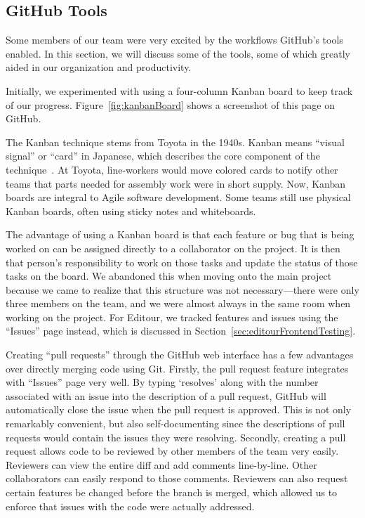 \documentclass[a4paper, 10pt, american, titlepage]{article}
\begin{document}
\subsection{GitHub Tools}
\label{sec:gitHubTools}

Some members of our team were very excited by the workflows GitHub's tools
enabled. In this section, we will discuss some of the tools, some of which
greatly aided in our organization and productivity.

Initially, we experimented with using a four-column Kanban board to keep track
of our progress. Figure~\ref{fig:kanbanBoard} shows a screenshot of this page on
GitHub.

The Kanban technique stems from Toyota in the 1940s. Kanban means ``visual
signal'' or ``card'' in Japanese, which describes the core component of the
technique~\autocite{terry2019}. At Toyota, line-workers would move colored cards
to notify other teams that parts needed for assembly work were in short supply.
Now, Kanban boards are integral to Agile software development. Some teams still
use physical Kanban boards, often using sticky notes and whiteboards.

The advantage of using a Kanban board is that each feature or bug that
is being worked on can be assigned directly to a collaborator on the project. It
is then that person's responsibility to work on those tasks and update the
status of those tasks on the board. We abandoned this when moving onto the main
project because we came to realize that this structure was not necessary---there
were only three members on the team, and we were almost always in the same room
when working on the project. For Editour, we tracked features and issues using
the ``Issues'' page instead, which is discussed in
Section~\ref{sec:editourFrontendTesting}.

Creating ``pull requests'' through the GitHub web interface has a few advantages
over directly merging code using Git. Firstly, the pull request feature
integrates with ``Issues'' page very well. By typing `resolves' along with the
number associated with an issue into the description of a pull request, GitHub
will automatically close the issue when the pull request is approved. This is
not only remarkably convenient, but also self-documenting since the descriptions
of pull requests would contain the issues they were resolving. Secondly,
creating a pull request allows code to be reviewed by other members of the team
very easily. Reviewers can view the entire diff and add comments line-by-line.
Other collaborators can easily respond to those comments. Reviewers can also
request certain features be changed before the branch is merged, which allowed
us to enforce that issues with the code were actually addressed.
\end{document}
